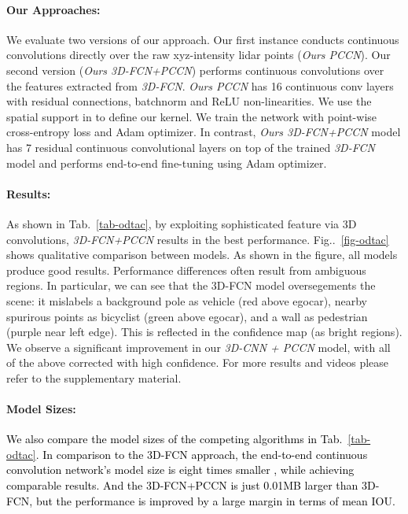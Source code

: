\documentclass[10pt,twocolumn,letterpaper]{article}
\makeatletter
\newcommand\shenlong[1]{\textcolor{black}{#1}}
\newcommand\simon[1]{\textcolor{black}{#1}}
\def\@onedot{\ifx\@let@token.\else.\null\fi\xspace}
\DeclareRobustCommand\onedot{\futurelet\@let@token\@onedot}
\newcommand{\figref}[1]{Fig\onedot~\ref{#1}}
\makeatother
\begin{document}
\paragraph{Our Approaches:} We evaluate two versions of our approach.   Our first instance conducts continuous convolutions directly over the raw xyz-intensity lidar points (\textit{Ours PCCN}). 
Our second version (\textit{Ours 3D-FCN+PCCN}) performs continuous convolutions over the features extracted from  \textit{3D-FCN}. 
\textit{Ours PCCN} has 16 continuous conv layers with residual connections, batchnorm and ReLU non-linearities. We use the spatial support in  to define our kernel.  
We train the network with point-wise cross-entropy loss and Adam \cite{adam} optimizer. In contrast, \textit{Ours 3D-FCN+PCCN} model has  7 residual continuous convolutional layers on top of the trained \textit{3D-FCN} model and performs end-to-end fine-tuning using Adam optimizer. 

\paragraph{Results:} As shown in Tab.~\ref{tab-odtac}, by exploiting sophisticated feature via 3D convolutions, \textit{3D-FCN+PCCN} results in the best performance. \figref{fig-odtac} shows qualitative comparison between models. As shown in the figure, all models produce good results. Performance differences often result from ambiguous regions. 
In particular, we can see that the 3D-FCN model oversegements the scene: it mislabels a background pole as vehicle (red above egocar), nearby spurirous points as bicyclist (green above egocar), and a wall as pedestrian (purple near left edge). This is reflected in the confidence map (as bright regions). We observe a significant improvement in our \textit{3D-CNN + PCCN} model, with all of the above corrected with high confidence. 
For more results and videos please refer to the supplementary material. 

\paragraph{Model Sizes:} \shenlong{We also compare the model sizes of the competing algorithms in Tab.~\ref{tab-odtac}. 
\simon{In comparison to} the 3D-FCN approach, the end-to-end continuous convolution network's model size is eight times smaller
, while achieving comparable results. And the 3D-FCN+PCCN is just 0.01MB larger than 3D-FCN, but the performance is improved by a large margin in terms of mean IOU. }
\end{document}
